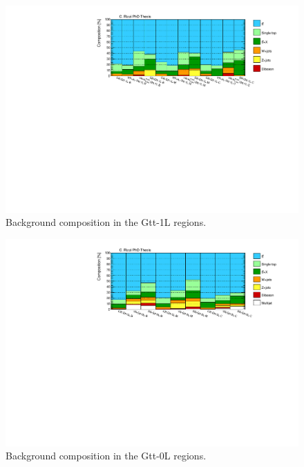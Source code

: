 \begin{figure}[htbp]
\includegraphics[width=\textwidth]{figures/strong_prod/comp_plots/Gtt_1L_bkg.pdf}
\caption{Background composition in the Gtt-1L regions.}
	\label{fig:bkgcomp_Gtt1L}
\end{figure}

\begin{figure}[htbp]
\includegraphics[width=\textwidth]{figures/strong_prod/comp_plots/Gtt_0L_bkg.pdf}
\caption{Background composition in the Gtt-0L regions.}
	\label{fig:bkgcomp_Gtt0L}
\end{figure}

